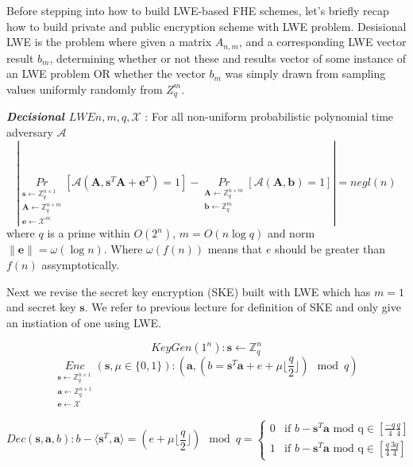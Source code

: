 \documentclass[usletter]{article}
\begin{document}
Before stepping into how to build LWE-based FHE schemes, let's briefly recap how to build private and public encryption scheme with LWE problem.
Desisional LWE is the problem where given a matrix $A_{n,m}$, and a corresponding LWE vector result $b_m$, determining whether or not these 
and results vector of some instance of an LWE problem OR whether the vector $b_m$ was simply 
drawn from sampling values uniformly randomly from $Z^{m}_{q}$. 
\begin{definition}
\textbf{\textit{Decisional $LWE{n,m,q,\mathcal{X}}$}} : For all non-uniform probabilistic polynomial time adversary $\mathcal{A}$
$$|\underset{\substack{
\pmb{s}\leftarrow \mathbb{Z}_q^{n\times1}\\
\pmb{A}\leftarrow\mathbb{Z}_q^{n\times m}\\
\pmb{e}\leftarrow \mathcal{X}^m}}{Pr}
[\mathcal{A}(\pmb{A},\pmb{s}^T\pmb{A}+\pmb{e}^T)=1]
-\underset{\substack{\pmb{A}\leftarrow\mathbb{Z}_q^{n\times m}\\
\pmb{b}\leftarrow\mathbb{Z}_q^m}}{Pr} 
[\mathcal{A}(\pmb{A},\pmb{b})=1]|=negl(n)$$
where $q$ is a prime within $O(2^n)$, $m=O(n\log q)$ and norm $\parallel \pmb{e}\parallel=\omega(\log n)$. Where $\omega(f(n))$ means that 
$e$ should be greater than $f(n)$ assymptotically.
\end{definition}


Next we revise the secret key encryption (SKE) built with LWE which has $m=1$ and secret key $\pmb{s}$. We refer to previous lecture for definition of SKE and only give an instiation of one using LWE.

$$KeyGen(1^n): \pmb{s}\leftarrow\mathbb{Z}_q^n$$
$$\underset{\substack{
\pmb{s}\leftarrow \mathbb{Z}_q^{n\times1}\\
\pmb{a}\leftarrow\mathbb{Z}_q^{n\times 1}\\
\pmb{e}\leftarrow \mathcal{X}}}{Enc}(\pmb{s},\mu\in\{0,1\}): (\pmb{a}, (b = \pmb{s}^T\pmb{a}+e+\mu\lfloor\frac{q}{2}\rfloor)\mod q)$$


$$Dec(\pmb{s},\pmb{a},b): b-\langle\pmb{s}^T,\pmb{a}\rangle=(e+\mu\lfloor\frac{q}{2}\rfloor) \mod q =   
  \begin{cases}
    0 & \text{if $b - \pmb{s}^T\pmb{a}$ mod q}  \in [\frac{-q}{4} \frac{q}{4} ] \\%
    1 & \text{if $b - \pmb{s}^T\pmb{a}$ mod q}  \in [\frac{q}{4} \frac{3q}{4} ]%
  \end{cases}$$
  
\end{document}

